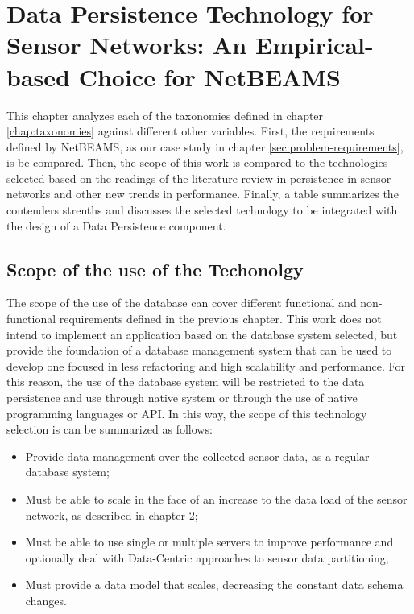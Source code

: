 

\chapter{Data Persistence Technology for Sensor Networks: An Empirical-based
Choice for NetBEAMS}

This chapter analyzes each of the taxonomies defined in chapter
\ref{chap:taxonomies} against different other variables. First, the
requirements defined by NetBEAMS, as our case study in chapter
\ref{sec:problem-requirements}, is be compared. Then, the scope of this work is
compared to the technologies selected based on the readings of the
literature review in persistence in sensor networks and other new trends in
performance. Finally, a table summarizes the contenders strenths and discusses
the selected technology to be integrated with the design of a Data
Persistence component.

\section{Scope of the use of the Techonolgy}

The scope of the use of the database can cover different functional and
non-functional requirements defined in the previous chapter. This work does
not intend to implement an application based on the database system selected,
but provide the foundation of a database management system that can be used to
develop one focused in less refactoring and high scalability and performance.
For this reason, the use of the database system will be restricted to the data
persistence and use through native system or through the use of native
programming languages or API. In this way, the scope of this technology
selection is can be summarized as follows:

\begin{itemize}
  \item Provide data management over the collected sensor data, as a regular
  database system;
  \item Must be able to scale in the face of an increase to the data load of
  the sensor network, as described in chapter 2;
  \item Must be able to use single or multiple servers to improve performance
  and optionally deal with Data-Centric approaches to sensor data partitioning;
  \item Must provide a data model that scales, decreasing the constant data
  schema changes.
\end{itemize}

